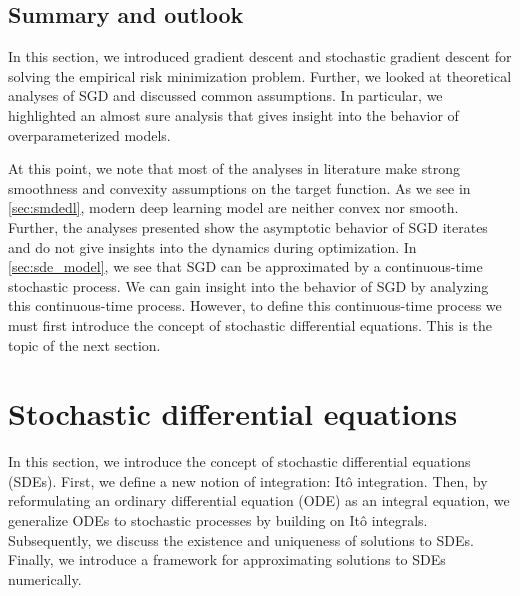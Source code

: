 \documentclass[12pt]{article}
\theoremstyle{definition}
\numberwithin{equation}{section}
\begin{document}
\subsection{Summary and outlook}
In this section, we introduced gradient descent and stochastic gradient descent for solving the empirical risk minimization problem. Further, we looked at theoretical analyses of SGD and discussed common assumptions. In particular, we highlighted an almost sure analysis that gives insight into the behavior of overparameterized models. 

At this point, we note that most of the analyses in literature make strong smoothness and convexity assumptions on the target function. As we see in \autoref{sec:smdedl}, modern deep learning model are neither convex nor smooth. Further, the analyses presented show the asymptotic behavior of SGD iterates and do not give insights into the dynamics during optimization. 
In \autoref{sec:sde_model}, we see that SGD can be approximated by a continuous-time stochastic process. We can gain insight into the behavior of SGD by analyzing this continuous-time process. However, to define this continuous-time process we must first introduce the concept of stochastic differential equations. This is the topic of the next section.


\section{Stochastic differential equations}
\label{sec:BackgroundSDETheory}
In this section, we introduce the concept of stochastic differential equations (SDEs). First, we define a new notion of integration: Itô integration. Then, by reformulating an ordinary differential equation (ODE) as an integral equation, we generalize ODEs to stochastic processes by building on Itô integrals. Subsequently, we discuss the existence and uniqueness of solutions to SDEs. Finally, we introduce a framework for approximating solutions to SDEs numerically.
\end{document}

